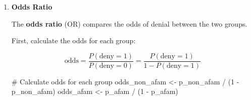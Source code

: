 \documentclass[
  12pt,
  letterpaper,
]{scrbook}
\newenvironment{Shaded}{\begin{snugshade}}{\end{snugshade}}
\newcommand{\CommentTok}[1]{\textcolor[rgb]{0.37,0.37,0.37}{#1}}
\newcommand{\DecValTok}[1]{\textcolor[rgb]{0.68,0.00,0.00}{#1}}
\newcommand{\FunctionTok}[1]{\textcolor[rgb]{0.28,0.35,0.67}{#1}}
\newcommand{\NormalTok}[1]{\textcolor[rgb]{0.00,0.23,0.31}{#1}}
\newcommand{\OtherTok}[1]{\textcolor[rgb]{0.00,0.23,0.31}{#1}}
\newcommand{\SpecialCharTok}[1]{\textcolor[rgb]{0.37,0.37,0.37}{#1}}
\newcommand{\StringTok}[1]{\textcolor[rgb]{0.13,0.47,0.30}{#1}}
\providecommand{\tightlist}{%
  \setlength{\itemsep}{0pt}\setlength{\parskip}{0pt}}
\renewcommand{\tightlist}{\setlength{\itemsep}{0.5\baselineskip}\setlength{\parskip}{0.2\baselineskip}}
\theoremstyle{plain}
\theoremstyle{definition}
\theoremstyle{remark}
\begin{document}
\begin{enumerate}
  The \textbf{risk ratio} or \textbf{relative risk} (RR) is the ratio of
  denial rates:

  \[
  RR = \frac{P(\text{deny}=1|\text{afam}=1)}{P(\text{deny}=1|\text{afam}=0)}
  \]

\begin{Shaded}
\begin{Highlighting}[]
\NormalTok{RR }\OtherTok{\textless{}{-}}\NormalTok{ p\_afam }\SpecialCharTok{/}\NormalTok{ p\_non\_afam}
\FunctionTok{cat}\NormalTok{(}\StringTok{"}\SpecialCharTok{\textbackslash{}n}\StringTok{Risk Ratio (Relative Risk):}\SpecialCharTok{\textbackslash{}n}\StringTok{"}\NormalTok{)}
\FunctionTok{cat}\NormalTok{(}\StringTok{"===========================}\SpecialCharTok{\textbackslash{}n}\StringTok{"}\NormalTok{)}
\FunctionTok{cat}\NormalTok{(}\FunctionTok{sprintf}\NormalTok{(}\StringTok{"RR = \%.4f / \%.4f = \%.4f}\SpecialCharTok{\textbackslash{}n}\StringTok{"}\NormalTok{, p\_afam, p\_non\_afam, RR))}
\end{Highlighting}
\end{Shaded}

\begin{verbatim}

Risk Ratio (Relative Risk):
===========================
RR = 0.2832 / 0.0926 = 3.0581
\end{verbatim}

  \textbf{Interpretation:} African American applicants have a denial
  rate that is 3.06 times higher than non-African American applicants.

  \begin{itemize}
  \tightlist
  \item
    If \(RR = 1\): no difference in risk
  \item
    If \(RR > 1\): higher risk for the treatment group (African
    Americans, \texttt{afam=1})
  \item
    If \(RR < 1\): lower risk for the treatment group
  \end{itemize}
\item
  \textbf{Odds Ratio}

  The \textbf{odds ratio} (OR) compares the odds of denial between the
  two groups.

  First, calculate the odds for each group:

  \[
  \text{odds} = \frac{P(\text{deny}=1)}{P(\text{deny}=0)} = \frac{P(\text{deny}=1)}{1 - P(\text{deny}=1)}
  \]

\begin{Shaded}
\begin{Highlighting}[]
\CommentTok{\# Calculate odds for each group}
\NormalTok{odds\_non\_afam }\OtherTok{\textless{}{-}}\NormalTok{ p\_non\_afam }\SpecialCharTok{/}\NormalTok{ (}\DecValTok{1} \SpecialCharTok{{-}}\NormalTok{ p\_non\_afam)}
\NormalTok{odds\_afam }\OtherTok{\textless{}{-}}\NormalTok{ p\_afam }\SpecialCharTok{/}\NormalTok{ (}\DecValTok{1} \SpecialCharTok{{-}}\NormalTok{ p\_afam)}


\end{Highlighting}
\end{Shaded}
\end{enumerate}
\end{document}
